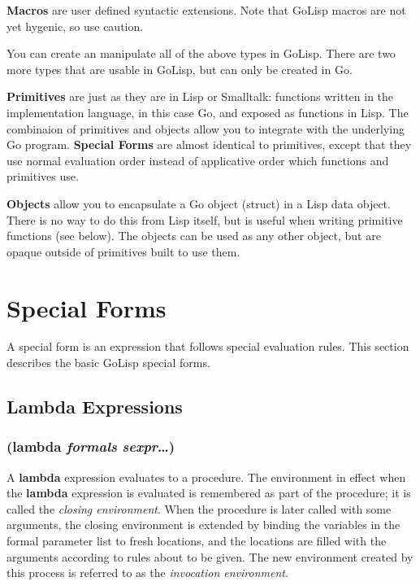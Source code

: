 \documentclass{article}
\begin{document}
\textbf{Macros} are user defined syntactic extensions. Note that GoLisp macros are not yet
hygenic, so use caution.

You can create an manipulate all of the above types in GoLisp. There are two more types that
are usable in GoLisp, but can only be created in Go.

\textbf{Primitives} are just as they are in Lisp or Smalltalk: functions written in the
implementation language, in this case Go, and exposed as functions in Lisp. The combinaion of
primitives and objects allow you to integrate with the underlying Go program. \textbf{Special
  Forms} are almost identical to primitives, except that they use normal evaluation order
instead of applicative order which functions and primitives use.

\textbf{Objects} allow you to encapsulate a Go object (struct) in a Lisp data object. There is
no way to do this from Lisp itself, but is useful when writing primitive functions (see
below). The objects can be used as any other object, but are opaque outside of primitives
built to use them.

\section{Special Forms}\label{sec:special-forms}

A special form is an expression that follows special evaluation rules. This section describes
the basic GoLisp special forms.

\subsection{Lambda Expressions}\label{sec:lambda-expressions}

\subsubsection{(lambda \emph{formals} \emph{sexpr}\ldots{})}

A \textbf{lambda} expression evaluates to a procedure. The environment in effect when the
\textbf{lambda} expression is evaluated is remembered as part of the procedure; it is called
the \emph{closing environment}. When the procedure is later called with some arguments, the
closing environment is extended by binding the variables in the formal parameter list to fresh
locations, and the locations are filled with the arguments according to rules about to be
given. The new environment created by this process is referred to as the \emph{invocation
  environment}.
\end{document}
